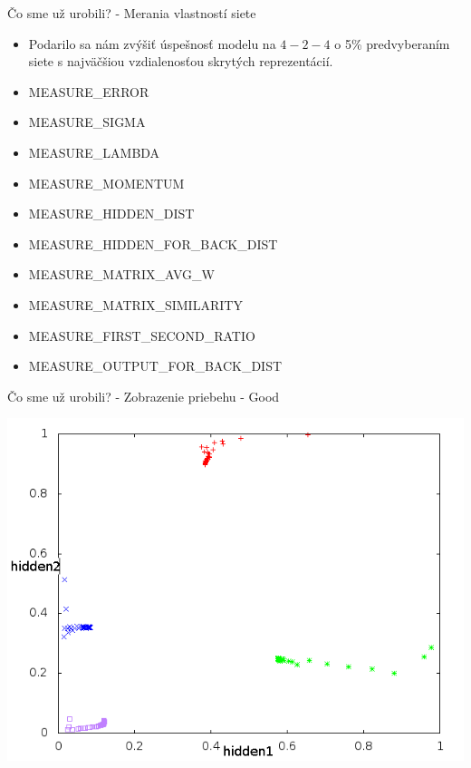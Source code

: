 \documentclass[xcolor=dvipsnames]{beamer}
\begin{document}
\begin{frame}{Čo sme už urobili? - Merania vlastností siete}
\begin{itemize} 
  \item Podarilo sa nám zvýšiť úspešnosť modelu na $4-2-4$ o 5\% predvyberaním siete s najväčšiou vzdialenosťou skrytých reprezentácií. 
\item MEASURE\_ERROR 
	\item MEASURE\_SIGMA 
	\item MEASURE\_LAMBDA
	\item MEASURE\_MOMENTUM
	\item MEASURE\_HIDDEN\_DIST 
	\item MEASURE\_HIDDEN\_FOR\_BACK\_DIST 
	\item MEASURE\_MATRIX\_AVG\_W 
	\item MEASURE\_MATRIX\_SIMILARITY 
	\item MEASURE\_FIRST\_SECOND\_RATIO 
	\item MEASURE\_OUTPUT\_FOR\_BACK\_DIST
	\end{itemize} 
\end{frame} 


\begin{frame}{Čo sme už urobili? - Zobrazenie priebehu - Good}
    \begin{center}
      \includegraphics[scale=0.5]{img/nice.png}
    \end{center} 
\end{frame} 
\end{document}
